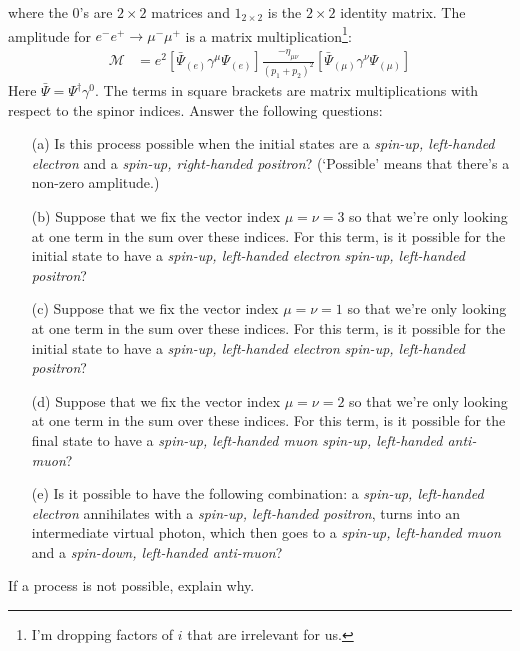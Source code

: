 \documentclass[12pt]{article}
\begin{document}
where the $0$'s are $2\times 2$ matrices and $1_{2\times 2}$ is the $2\times 2$ identity matrix. The amplitude for $e^-e^+ \to \mu^-\mu^+$ is a matrix multiplication\footnote{I'm dropping factors of $i$ that are irrelevant for us.}:
\begin{align}
	\mathcal M &=
	e^2\left[ \bar\Psi_{(e)}\gamma^\mu \Psi_{(e)} \right]
	\frac{-\eta_{\mu\nu}}{(p_1+p_2)^2}
	\left[ \bar\Psi_{(\mu)}\gamma^\nu \Psi_{(\mu)} \right]
\end{align}
Here $\bar\Psi = \Psi^\dag \gamma^0$.  The terms in square brackets are matrix multiplications with respect to the spinor indices. Answer the following questions:
\begin{enumerate}
	\item[(a)] Is this process possible when the initial states are a \emph{spin-up, left-handed electron} and a \emph{spin-up, right-handed positron}? (`Possible' means that there's a non-zero amplitude.)
	\item[(b)] Suppose that we fix the vector index $\mu = \nu = 3$ so that we're only looking at one term in the sum over these indices. For this term, is it possible for the initial state to have a \emph{spin-up, left-handed electron}  \emph{spin-up, left-handed positron}?
	\item[(c)] Suppose that we fix the vector index $\mu = \nu = 1$ so that we're only looking at one term in the sum over these indices. For this term, is it possible for the initial state to have a \emph{spin-up, left-handed electron}  \emph{spin-up, left-handed positron}?
	\item[(d)] Suppose that we fix the vector index $\mu = \nu = 2$ so that we're only looking at one term in the sum over these indices. For this term, is it possible for the final state to have a \emph{spin-up, left-handed muon}  \emph{spin-up, left-handed anti-muon}?
	\item[(e)] Is it possible to have the following combination: a \emph{spin-up, left-handed electron} annihilates with a \emph{spin-up, left-handed positron}, turns into an intermediate virtual photon, which then goes to a \emph{spin-up, left-handed muon} and a \emph{spin-down, left-handed anti-muon}? 
\end{enumerate}
If a process is not possible, explain why.
\end{document}
